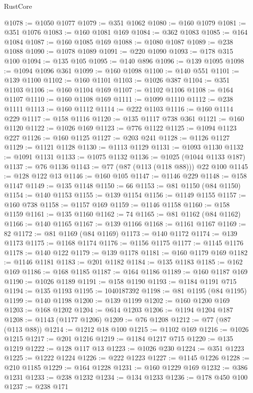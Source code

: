 \begin{lexlean}{RustCore}
\begin{coremodule}
@1078 := @1050 @1077
@1079 := @351 @1062
@1080 := @160 @1079
@1081 := @351 @1076
@1083 := @160 @1081 @169
@1084 := @362 @1083
@1085 := @164 @1084
@1087 := @160 @1085 @169
@1088 := @1080 @1087
@1089 := @238 @1088
@1090 := @1078 @1089
@1091 := @220 @1090
@1093 := @178 @315 @100
@1094 := @135 @105
@1095 := @140 @896
@1096 := @139 @1095
@1098 := @1094 @1096 @361
@1099 := @160 @1098
@1100 := @140 @551
@1101 := @139 @1100
@1102 := @160 @1101
@1103 := @1026 @387
@1104 := @351 @1103
@1106 := @160 @1104 @169
@1107 := @1102 @1106
@1108 := @164 @1107
@1110 := @160 @1108 @169
@1111 := @1099 @1110
@1112 := @238 @1111
@1113 := @160 @1112
@1114 := @222 @1103
@1116 := @160 @1114 @229
@1117 := @158 @1116
@1120 := @135 @1117 @738 @361
@1121 := @160 @1120
@1122 := @1026 @169
@1123 := @776 @1122
@1125 := @1094 @1123 @227
@1126 := @160 @1125
@1127 := @203 @241
@1128 := @1126 @1127
@1129 := @1121 @1128
@1130 := @1113 @1129
@1131 := @1093 @1130
@1132 := @1091 @1131
@1133 := @1075 @1132
@1136 := @1025 (@1044 @1133 @187)
@1137 := @76 @1136
@1143 := @77 (@87 (@113 (@118 @88))) @22 @100
@1145 := @128 @122 @13
@1146 := @160 @105
@1147 := @1146 @229
@1148 := @158 @1147
@1149 := @135 @1148
@1150 := 66
@1153 := @81 @1150 (@84 @1150)
@1154 := @140 @1153
@1155 := @139 @1154
@1156 := @1149 @1155
@1157 := @160 @738
@1158 := @1157 @169
@1159 := @1146 @1158
@1160 := @158 @1159
@1161 := @135 @1160
@1162 := 74
@1165 := @81 @1162 (@84 @1162)
@1166 := @140 @1165
@1167 := @139 @1166
@1168 := @1161 @1167
@1169 := 82
@1172 := @81 @1169 (@84 @1169)
@1173 := @140 @1172
@1174 := @139 @1173
@1175 := @1168 @1174
@1176 := @1156 @1175
@1177 := @1145 @1176
@1178 := @140 @122
@1179 := @139 @1178
@1181 := @160 @1179 @169
@1182 := @1146 @1181
@1183 := @201 @1182
@1184 := @135 @1183
@1185 := @162 @169
@1186 := @168 @1185
@1187 := @164 @1186
@1189 := @160 @1187 @169
@1190 := @1026 @1189
@1191 := @158 @1190
@1193 := @1184 @1191 @715
@1194 := @135 @1193
@1195 := 1040187392
@1198 := @81 @1195 (@84 @1195)
@1199 := @140 @1198
@1200 := @139 @1199
@1202 := @160 @1200 @169
@1203 := @168 @1202
@1204 := @614 @1203
@1206 := @1194 @1204 @187
@1208 := @1143 (@1177 @1206)
@1209 := @76 @1208
@1212 := @77 (@87 (@113 @88))
@1214 := @1212 @18 @100
@1215 := @1102 @169
@1216 := @1026 @1215
@1217 := @201 @1216
@1219 := @1184 @1217 @715
@1220 := @135 @1219
@1222 := @128 @117 @13
@1223 := @1026 @230
@1224 := @351 @1223
@1225 := @1222 @1224
@1226 := @222 @1223
@1227 := @1145 @1226
@1228 := @210 @1185
@1229 := @164 @1228
@1231 := @160 @1229 @169
@1232 := @386 @1231
@1233 := @238 @1232
@1234 := @134 @1233
@1236 := @178 @450 @100
@1237 := @238 @171

\end{coremodule}
\end{lexlean}
